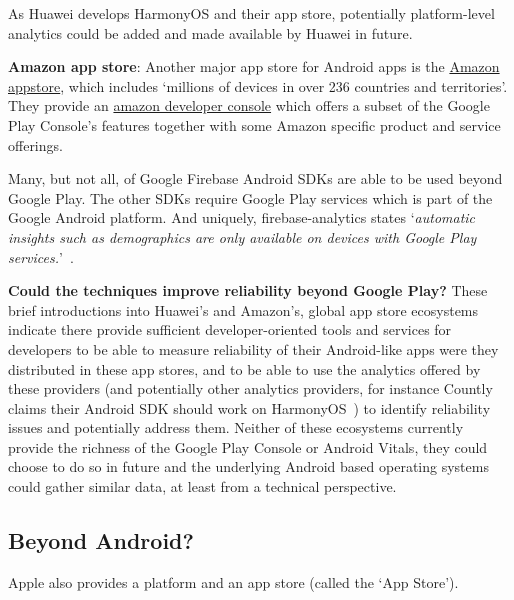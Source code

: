 As Huawei develops HarmonyOS and their app store, potentially platform-level analytics could be added and made available by Huawei in future.

\textbf{Amazon app store}: 
Another major app store for Android apps is the \href{https://developer.amazon.com/apps-and-games}{Amazon appstore}, which includes `millions of devices in over 236 countries and territories'. They provide an \href{https://developer.amazon.com/settings/console/home}{amazon developer console} which offers a subset of the Google Play Console's features together with some Amazon specific product and service offerings. 

Many, but not all, of Google Firebase Android SDKs are able to be used beyond Google Play. The other SDKs require Google Play services which is part of the Google Android platform. And uniquely, firebase-analytics states `\emph{automatic insights such as demographics are only available on devices with Google Play services.}'~\citep{firebasesupport2020_dependencies_of_firebase_sdks_on_google_play_services}. 


\textbf{Could the techniques improve reliability beyond Google Play?} 
These brief introductions into Huawei's and Amazon's, global app store ecosystems indicate there provide sufficient developer-oriented tools and services for developers to be able to measure reliability of their Android-like apps were they distributed in these app stores, and to be able to use the analytics offered by these providers (and potentially other analytics providers, for instance Countly claims their Android SDK should work on HarmonyOS~\citep{countly_which_operating_systems_are_supported}) to identify reliability issues and potentially address them. Neither of these ecosystems currently provide the richness of the Google Play Console or Android Vitals, they could choose to do so in future and the underlying Android based operating systems could gather similar data, at least from a technical perspective.

\subsection{Beyond Android?}

Apple also provides a platform and an app store (called the `App Store'). 

